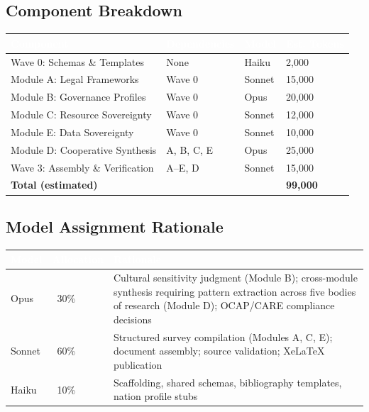 \documentclass[11pt,letterpaper]{article}
\newcommand{\tableheader}[1]{\textbf{\sffamily\textcolor{white}{#1}}}
\begin{document}
\subsection{Component Breakdown}

\begin{center}
\begin{tabularx}{\textwidth}{L{3.5cm}L{3cm}C{1.5cm}C{2cm}}
\toprule
{}
\tableheader{Component} & \tableheader{Dependencies} & \tableheader{Model} & \tableheader{Est. Tokens} \\
\midrule
Wave 0: Schemas \& Templates & None & Haiku & 2,000 \\
Module A: Legal Frameworks & Wave 0 & Sonnet & 15,000 \\
Module B: Governance Profiles & Wave 0 & Opus & 20,000 \\
Module C: Resource Sovereignty & Wave 0 & Sonnet & 12,000 \\
Module E: Data Sovereignty & Wave 0 & Sonnet & 10,000 \\
Module D: Cooperative Synthesis & A, B, C, E & Opus & 25,000 \\
Wave 3: Assembly \& Verification & A--E, D & Sonnet & 15,000 \\
\textbf{Total (estimated)} & & & \textbf{99,000} \\
\bottomrule
\end{tabularx}
\end{center}

\subsection{Model Assignment Rationale}

\begin{center}
\begin{tabularx}{\textwidth}{L{2cm}L{2cm}X}
\toprule
{}
\tableheader{Model} & \tableheader{Allocation} & \tableheader{Rationale} \\
\midrule
Opus & ~30\% & Cultural sensitivity judgment (Module B); cross-module synthesis requiring pattern extraction across five bodies of research (Module D); OCAP/CARE compliance decisions \\
Sonnet & ~60\% & Structured survey compilation (Modules A, C, E); document assembly; source validation; XeLaTeX publication \\
Haiku & ~10\% & Scaffolding, shared schemas, bibliography templates, nation profile stubs \\
\bottomrule
\end{tabularx}
\end{center}
\end{document}
